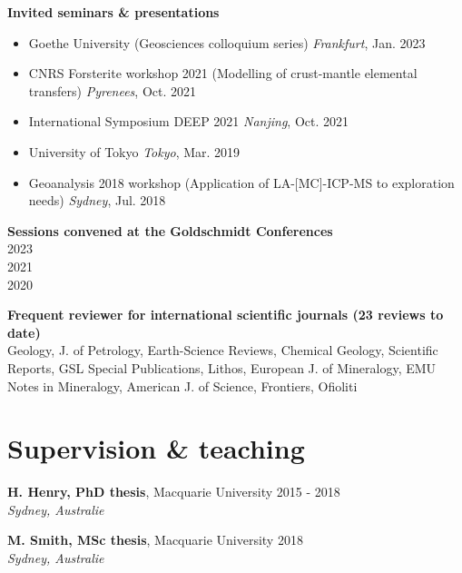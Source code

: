 \documentclass[a4paper,11pt]{article}
\begin{document}
    \textbf{Invited seminars \& presentations}
    \begin{itemize}[label={},itemsep=0pt,parsep=0pt]
        \item Goethe University (Geosciences colloquium series)
            \hfill \textit{Frankfurt}, {Jan. 2023}
        \item CNRS Forsterite workshop 2021 (Modelling of crust-mantle elemental transfers)
            \hfill \textit{Pyrenees}, {Oct. 2021}
        \item International Symposium DEEP 2021
            \hfill \textit{Nanjing}, {Oct. 2021}
        \item University of Tokyo
            \hfill \textit{Tokyo}, {Mar. 2019}
        \item Geoanalysis 2018 workshop (Application of LA-[MC]-ICP-MS to exploration needs)
            \hfill \textit{Sydney}, {Jul. 2018}
    \end{itemize}

    \textbf{Sessions convened at the Goldschmidt Conferences}\\
     \hfill {2023}\\
     \hfill {2021} \\
     \hfill {2020}
    
    \textbf{Frequent reviewer for international scientific journals (23 reviews to date)}\\
      Geology, J. of Petrology, Earth-Science Reviews, Chemical Geology, Scientific Reports, GSL Special Publications, Lithos, European J. of Mineralogy, EMU Notes in Mineralogy, American J. of Science, Frontiers, Ofioliti

\section{Supervision \& teaching}
    \textbf{H. Henry, PhD thesis}, Macquarie University
    \hfill {2015 - 2018}\\ 
    \hfill \textit{Sydney, Australie}

    \textbf{M. Smith, MSc thesis}, Macquarie University
    \hfill {2018}\\ 
    \hfill \textit{Sydney, Australie}
\end{document}

